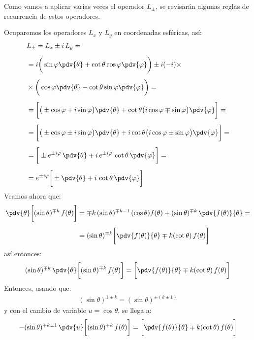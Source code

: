 Como vamos a aplicar varias veces el operador $L_{\pm}$, se revisarán algunas reglas de recurrencia de estos operadores.
\par
Ocuparemos los operadores $L_{x}$ y $L_{y}$ en coordenadas esféricas, así:
\begin{align}
\begin{aligned}[b]
&L_{\pm} = L_{x} \pm i \, L_{y} = \\[0.5em]
&= i \bigg( \sin \varphi \pdv{\theta} + \cot \theta \cos \varphi \pdv{\varphi} \bigg) \pm i (-i) \times \\[0.5em]
&\times \bigg( \cos \varphi \pdv{\theta} - \cot \theta \sin \varphi \pdv{\varphi} \bigg) = \\[0.5em]
&= \bigg[ \big( \pm \cos \varphi + i \sin \varphi \big) \pdv{\theta} + \cot \theta \big( i \cos \varphi \mp \sin \varphi \big) \pdv{\varphi} \bigg] = \\[0.5em]
&= \bigg[ \big( \pm \cos \varphi \pm i \sin \varphi \big) \pdv{\theta} + i \cot \theta \big( i \cos \varphi \pm \sin \varphi \big) \pdv{\varphi} \bigg] = \\[0.5em]
&= \bigg[ \pm e^{\pm i \varphi} \, \pdv{\theta} + i \, e^{\pm i \varphi} \, \cot \theta \, \pdv{\varphi} \bigg] = \\[0.5em]
&= e^{\pm i \varphi} \bigg[ \pm \pdv{\theta} + i \, \cot \theta \, \pdv{\varphi} \bigg]
\end{aligned}
\label{eq:ecuacion_10_159}
\end{align}
Veamos ahora que:
\begin{align*}
\pdv{\theta} \bigg[ (\sin \theta)^{\mp k} \, f(\theta) \bigg] &= \mp k \, (\sin \theta)^{\mp k-1} \, (\cos \theta) f(\theta) + (\sin \theta)^{\mp k} \, \pdv{f(\theta)}{\theta} = \\[0.5em]
&= (\sin \theta)^{\mp k} \bigg[ \pdv{f(\theta)}{\theta} \mp k (\cot \theta) \, f(\theta) \bigg]
\end{align*}
así entonces:
\begin{align*}
(\sin \theta)^{\mp k} \, \pdv{\theta} \bigg[ (\sin \theta)^{\mp k} \, f(\theta) \bigg] = \bigg[ \pdv{f(\theta)}{\theta} \mp k (\cot \theta) \, f(\theta) \bigg]
\end{align*}
Entonces, usando que:
\begin{align*}
(\sin \theta)^{1 \pm k} = (\sin \theta)^{\pm (k \pm 1)}
\end{align*}
y con el cambio de variable $u = \cos \theta$, se llega a:
\begin{align*}
-(\sin \theta)^{\mp k \pm 1} \, \pdv{u} \bigg[ (\sin \theta)^{\mp k} \, f(\theta) \bigg] = \bigg[ \pdv{f(\theta)}{\theta} \mp k (\cot \theta) \, f(\theta) \bigg]
\end{align*}
